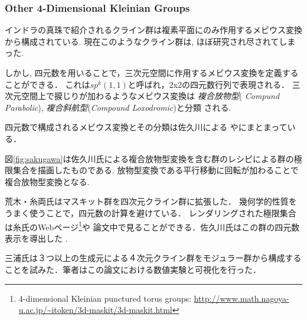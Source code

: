 \subsubsection{Other 4-Dimensional Kleinian Groups}

インドラの真珠で紹介されるクライン群は複素平面にのみ作用するメビウス変換から構成されている.
現在このようなクライン群は, ほぼ研究され尽されてしまった.

しかし, 四元数を用いることで，三次元空間に作用するメビウス変換を定義することができる．
これは$sp^k(1, 1)$と呼ばれ，2x2の四元数行列で表現される．
三次元空間上で捩じりが加わるようなメビウス変換は \emph{複合放物型}({\it
Compund Parabolic}), \emph{複合斜航型}({\it Compound Loxodromic})と分類
される.

四元数で構成されるメビウス変換とその分類は佐久川による
\cite{sakugawaMaster}や\cite{accidentalParabolic}にまとまっている．

図\ref{fig:sakugawa}は佐久川氏による複合放物型変換を含む群のレシピによる群の極限集合を描画したものである.
放物型変換である平行移動に回転が加わることで複合放物型変換となる.

荒木・糸両氏はマスキット群を四次元クライン群に拡張した\cite{maskit}．
幾何学的性質をうまく使うことで，四元数の計算を避けている．
レンダリングされた極限集合は糸氏のWebページ\footnote{4-dimensional
Kleinian punctured torus groups:
\url{http://www.math.nagoya-u.ac.jp/~itoken/3d-maskit/3d-maskit.html}}や
論文中で見ることができる．佐久川氏はこの群の四元数表示を導出した
\cite{sakugawa4d}.

三浦氏は３つ以上の生成元による４次元クライン群をモジュラー群から構成することを試みた\cite{miura}．筆者はこの論文における数値実験と可視化を行った．

